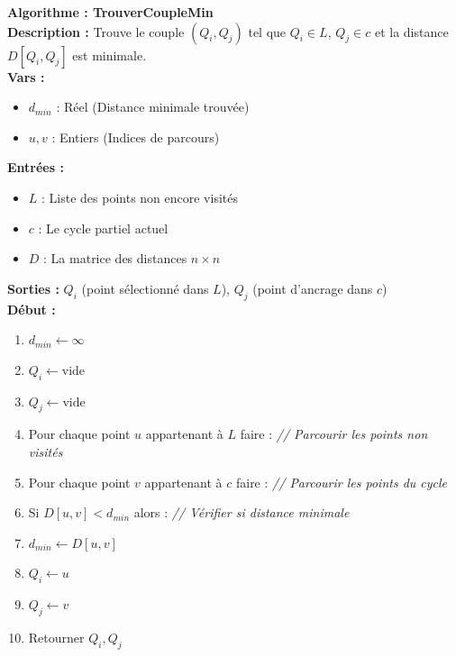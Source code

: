 \documentclass[a4paper, 12pt]{article}
\begin{document}
\begin{tcolorbox}[colback=darkWhite!75!white,colframe=black!30,left=5pt,right=5pt,top=5pt,bottom=5pt]
\textbf{Algorithme : TrouverCoupleMin} \\
\textbf{Description :} Trouve le couple $(Q_i, Q_j)$ tel que $Q_i \in L$, $Q_j \in c$ et la distance $D[Q_i, Q_j]$ est minimale. \\
\textbf{Vars :}
\begin{itemize}
    \item $d_{min}$ : Réel (Distance minimale trouvée)
    \item $u, v$ : Entiers (Indices de parcours)
\end{itemize}
\textbf{Entrées :}
\begin{itemize}
    \item $L$ : Liste des points non encore visités
    \item $c$ : Le cycle partiel actuel
    \item $D$ : La matrice des distances $n \times n$
\end{itemize}
\textbf{Sorties :} $Q_i$ (point sélectionné dans $L$), $Q_j$ (point d'ancrage dans $c$) \\
\textbf{Début :}
\begin{enumerate}
    \item $d_{min} \leftarrow \infty$
    \item $Q_i \leftarrow \text{vide}$
    \item $Q_j \leftarrow \text{vide}$
    \item Pour chaque point $u$ appartenant à $L$ faire : \textit{// Parcourir les points non visités}
    \item \quad Pour chaque point $v$ appartenant à $c$ faire : \textit{// Parcourir les points du cycle}
    \item \quad \quad Si $D[u, v] < d_{min}$ alors : \textit{// Vérifier si distance minimale}
    \item \quad \quad \quad $d_{min} \leftarrow D[u, v]$
    \item \quad \quad \quad $Q_i \leftarrow u$
    \item \quad \quad \quad $Q_j \leftarrow v$
    \item Retourner $Q_i, Q_j$
\end{enumerate}
\end{tcolorbox}
\end{document}

